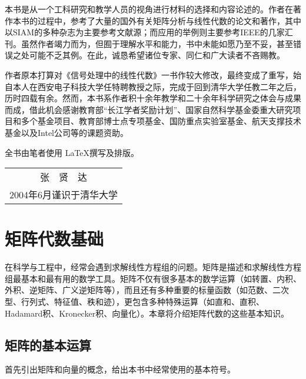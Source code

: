 \documentclass[punct=kaiming, fontset=sikou]{ctexbook}
\numberwithin{equation}{section}
\begin{document}
  本书是从一个工科研究和教学人员的视角进行材料的选择和内容论述的。作者在著作本书的过程中，参考了大量的国外有关矩阵分析与线性代数的论文和著作，其中以SIAM的多种杂志为主要参考文献源；而应用的举例则主要参考IEEE的几家汇刊。虽然作者竭力而为，但囿于理解水平和能力，书中未能如愿乃至不妥，甚至错误之处可能不乏其例。在此，诚恳希望诸位专家、同仁和广大读者不吝赐教。

  作者原本打算对《信号处理中的线性代数》一书作较大修改，最终变成了重写，始自本人在西安电子科技大学任特聘教授之际，完成于回到清华大学任教二年之后，历时四载有余。然而，本书系作者积十余年教学和二十余年科学研究之体会与成果而成，借此机会感谢教育部“长江学者奖励计划”、国家自然科学基金委重大研究项目和多个基金项目、教育部博士点专项基金、国防重点实验室基金、航天支撑技术基金以及Intel公司等的课题资助。

  全书由笔者使用 \LaTeX 撰写及排版。
  \begin{flushright}
    \fangsong
    \begin{tabular}{c@{}}
      张　贤　达\\
      {\small 2004年6月谨识于清华大学}
    \end{tabular}\hspace*{2\ccwd}
  \end{flushright}

  \tableofcontents
  \mainmatter
  \chapter{矩阵代数基础}
  在科学与工程中，经常会遇到求解线性方程组的问题。矩阵是描述和求解线性方程组最基本和最有用的数学工具。矩阵不仅有很多基本的数学运算（如转置、内积、外积、逆矩阵、广义逆矩阵等），而且还有多种重要的标量函数（如范数、二次型、行列式、特征值、秩和迹），更包含多种特殊运算（如直和、直积、Hadamard积、Kronecker积、向量化）。本章将介绍矩阵代数的这些基本知识。

  \section{矩阵的基本运算}
  首先引出矩阵和向量的概念，给出本书中经常使用的基本符号。
\end{document}

